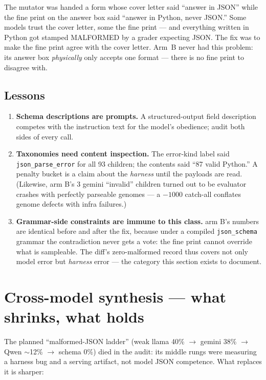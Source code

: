 \documentclass[11pt]{article}
\newcommand{\armB}{\textcolor{accent}{arm B}}
\newenvironment{eli5}
  {\par\medskip\noindent\begin{lrbox}{\eliBox}\begin{minipage}{\dimexpr\linewidth-2\fboxsep-2\fboxrule}\small}
  {\end{minipage}\end{lrbox}\noindent\fcolorbox{accent!40}{accent!4}{\usebox{\eliBox}}\par\medskip}
\begin{document}
\begin{eli5}
The mutator was handed a form whose cover letter said ``answer in JSON'' while the fine print on
the answer box said ``answer in Python, never JSON.'' Some models trust the cover letter, some
the fine print --- and everything written in Python got stamped MALFORMED by a grader expecting
JSON. The fix was to make the fine print agree with the cover letter. Arm~B never had this
problem: its answer box \emph{physically} only accepts one format --- there is no fine print to
disagree with.
\end{eli5}

\subsection{Lessons}
\begin{enumerate}
  \item \textbf{Schema descriptions are prompts.} A structured-output field description competes
  with the instruction text for the model's obedience; audit both sides of every call.
  \item \textbf{Taxonomies need content inspection.} The error-kind label said
  \texttt{json\_parse\_error} for all 93 children; the contents said ``87 valid Python.'' A
  penalty bucket is a claim about the \emph{harness} until the payloads are read. (Likewise,
  \armB's 3 gemini ``invalid'' children turned out to be evaluator crashes with perfectly
  parseable genomes --- a $-1000$ catch-all conflates genome defects with infra failures.)
  \item \textbf{Grammar-side constraints are immune to this class.} \armB's numbers are
  identical before and after the fix, because under a compiled \texttt{json\_schema} grammar
  the contradiction never gets a vote: the fine print cannot override what is sampleable. The
  diff's zero-malformed record thus covers not only model error but \emph{harness} error --- the
  category this section exists to document.
\end{enumerate}

\section{Cross-model synthesis --- what shrinks, what holds}
\label{sec:synthesis}
The planned ``malformed-JSON ladder'' (weak llama 40\% $\to$ gemini 38\% $\to$ Qwen $\sim$12\%
$\to$ schema 0\%) died in the audit: its middle rungs were measuring a harness bug and a serving
artifact, not model JSON competence. What replaces it is sharper:
\end{document}
